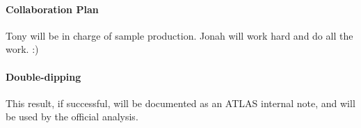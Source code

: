 \documentclass[11pt]{article}
\begin{document}
\paragraph{Collaboration Plan}
Tony will be in charge of sample production. Jonah will work hard and do all the work. :) 

\paragraph{Double-dipping}
This result, if successful, will be documented as an ATLAS internal note, and will be used by the official analysis.
\end{document}
